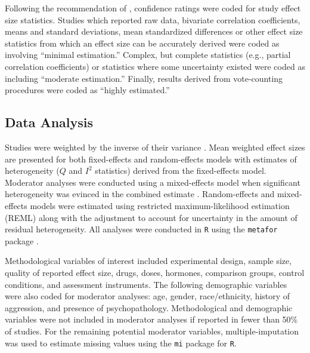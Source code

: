 \documentclass[jou]{apa6}
\begin{document}
Following the recommendation of \textcite{Orwin85}, confidence ratings were coded for study effect size statistics. Studies which reported raw data, bivariate correlation coefficients, means and standard deviations, mean standardized differences or other effect size statistics from which an effect size can be accurately derived were coded as involving ``minimal estimation.'' Complex, but complete statistics (e.g., partial correlation coefficients) or statistics where some uncertainty existed were coded as including ``moderate estimation.'' Finally, results derived from vote-counting procedures were coded as ``highly estimated.''


\subsection{Data Analysis}
Studies were weighted by the inverse of their variance \parencite{Shadish09}. Mean weighted effect sizes are presented for both fixed-effects and random-effects models with estimates of heterogeneity ($Q$ and $I^2$ statistics) derived from the fixed-effects model. Moderator analyses were conducted using a mixed-effects model when significant heterogeneity was evinced in the combined estimate \parencite[see][]{Lipsey01}. Random-effects and mixed-effects models were estimated using restricted maximum-likelihood estimation (REML) along with the \textcite{Knapp03} adjustment to account for uncertainty in the amount of residual heterogeneity.  All analyses were conducted in \texttt{R} using the \texttt{metafor} package \parencite{metafor}.  


Methodological variables of interest included experimental design, sample size, quality of reported effect size, drugs, doses, hormones, comparison groups, control conditions, and assessment instruments. The following demographic variables were also coded for moderator analyses: age, gender, race/ethnicity, history of aggression, and presence of psychopathology. Methodological and demographic variables were not included in moderator analyses if reported in fewer than 50\% of studies. For the remaining potential moderator variables, multiple-imputation \parencite{Pigott09} was used to estimate missing values using the \texttt{mi} package \parencite{mi} for \texttt{R}. 
\end{document}
